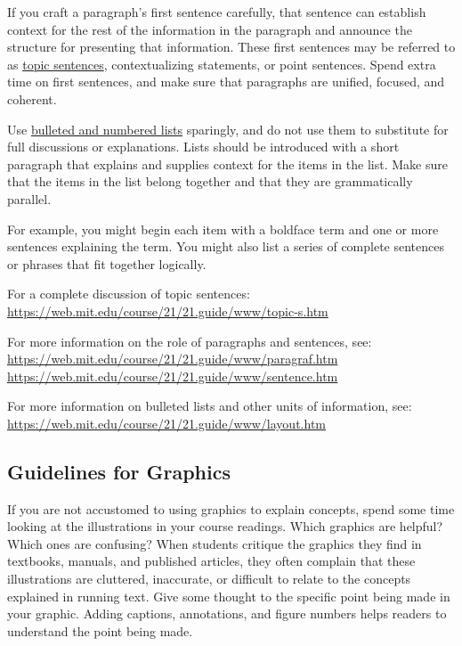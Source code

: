 \documentclass[strict]{6033dp1}
\begin{document}
If you craft a paragraph's first sentence carefully, that sentence can
establish context for the rest of the information in the paragraph and
announce the structure for presenting that information.  These first
sentences may be referred to as \uline{topic sentences},
contextualizing statements, or point sentences.  Spend extra time on
first sentences, and make sure that paragraphs are unified, focused,
and coherent.

Use \uline{bulleted and numbered lists} sparingly, and do not use them
to substitute for full discussions or explanations.  Lists should be
introduced with a short paragraph that explains and supplies context
for the items in the list.  Make sure that the items in the list
belong together and that they are grammatically parallel.

For example, you might begin each item with a boldface term and one or
more sentences explaining the term.  You might also list a series of
complete sentences or phrases that fit together logically.

For a complete discussion of topic sentences:\\
\url{https://web.mit.edu/course/21/21.guide/www/topic-s.htm}

For more information on the role of paragraphs and sentences, see:\\
\url{https://web.mit.edu/course/21/21.guide/www/paragraf.htm}\\
\url{https://web.mit.edu/course/21/21.guide/www/sentence.htm}

For more information on bulleted lists and other units of information,
see:\\
\url{https://web.mit.edu/course/21/21.guide/www/layout.htm}

\subsection{Guidelines for Graphics}
If you are not accustomed to using graphics to explain concepts, spend
some time looking at the illustrations in your course readings.  Which
graphics are helpful?  Which ones are confusing?  When students
critique the graphics they find in textbooks, manuals, and published
articles, they often complain that these illustrations are cluttered,
inaccurate, or difficult to relate to the concepts explained in
running text.  Give some thought to the specific point being made in
your graphic.  Adding captions, annotations, and figure numbers helps
readers to understand the point being made.
\end{document}
